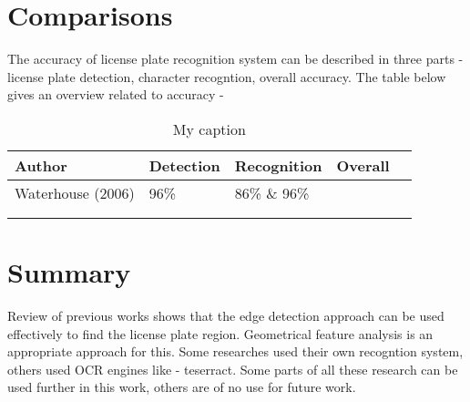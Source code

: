 \section{Comparisons}

The accuracy of license plate recognition system can be described in three parts - license plate detection, character recogntion, overall accuracy. The table below gives an overview related to accuracy -



\begin{table}[]
\centering
\begin{tabular}{|l|l|l|l|l|}
\hline
 Author & Detection & Recognition & Overall \\ \hline
 Waterhouse (2006)  & 96\% & 86\% \& 96\%  &   \\ \hline
 &  &  &  &  \\ \hline
 &  &  &  &  \\ \hline
\end{tabular}
\caption{My caption}
\label{my-label}
\end{table}

\section{Summary}


Review of previous works shows that the edge detection approach can be used effectively to find the license plate region. Geometrical feature analysis is an appropriate approach for this. Some researches used their own recogntion system, others used OCR engines like - teserract. Some parts of all these research can be used further in this work, others are of no use for future work.
